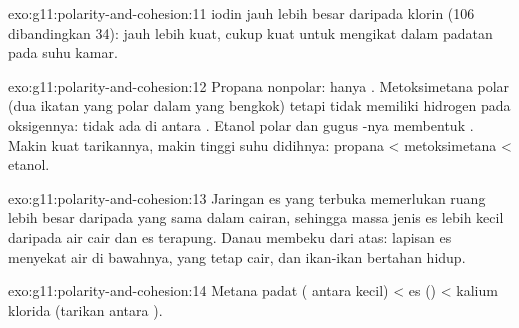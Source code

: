 \begin{solution}{exo:g11:polarity-and-cohesion:11}
 iodin jauh lebih besar daripada  klorin (106 
dibandingkan 34):  jauh lebih kuat, cukup
kuat untuk mengikat  dalam padatan pada suhu kamar.
\end{solution}

\begin{solution}{exo:g11:polarity-and-cohesion:12}
Propana nonpolar: hanya . Metoksimetana polar
(dua ikatan  yang polar dalam  yang bengkok) tetapi
tidak memiliki hidrogen pada oksigennya: tidak ada  di
antara . Etanol polar dan gugus -nya
membentuk . Makin kuat tarikannya, makin tinggi suhu
didihnya: propana < metoksimetana < etanol.
\end{solution}

\begin{solution}{exo:g11:polarity-and-cohesion:13}
Jaringan es yang terbuka memerlukan ruang lebih besar daripada
 yang sama dalam cairan, sehingga massa jenis es lebih
kecil daripada air cair dan es terapung. Danau membeku dari atas:
lapisan es menyekat air di bawahnya, yang tetap cair, dan ikan-ikan
bertahan hidup.
\end{solution}

\begin{solution}{exo:g11:polarity-and-cohesion:14}
Metana padat ( antara  kecil) <
es () < kalium klorida (tarikan antara ).
\end{solution}

